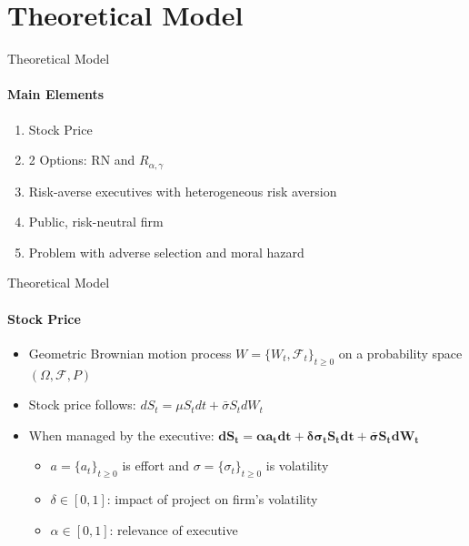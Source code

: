 \documentclass[compress]{beamer}
\begin{document}
\section{Theoretical Model}
\begin{frame}{Theoretical Model}
    \framesubtitle{Main Elements}
    \begin{enumerate}
        \item Stock Price
        \item 2 Options: RN and $R_{\alpha, \gamma}$
        \item Risk-averse executives with heterogeneous risk aversion
        \item Public, risk-neutral firm
        \item Problem with adverse selection and moral hazard
    \end{enumerate}
\end{frame}

\begin{frame}{Theoretical Model}
    \framesubtitle{Stock Price}
    \begin{itemize}
        \item Geometric Brownian motion process $W = \{ W_t, \mathscr{F}_t \}_{t \ge 0}$ on a probability space $(\Omega, \mathscr{F}, P)$
        \vspace*{5pt}
        \item Stock price follows: $dS_t = \mu S_t dt + \bar{\sigma} S_t dW_t$
        \vspace*{5pt}
        \item When managed by the executive: $\boldsymbol{dS_t = \alpha a_t dt + \delta \sigma_t S_t dt + \bar{\sigma} S_t dW_t}$
        \begin{itemize}
            \item $a = \{a_t\}_{t \ge 0}$ is effort and $\sigma = \{\sigma_t\}_{t \ge 0}$ is volatility
            \item $\delta \in [0,1]$: impact of project on firm's volatility
            \item $\alpha \in [0,1]$: relevance of executive
        \end{itemize}
    \end{itemize}
\end{frame}
\end{document}
